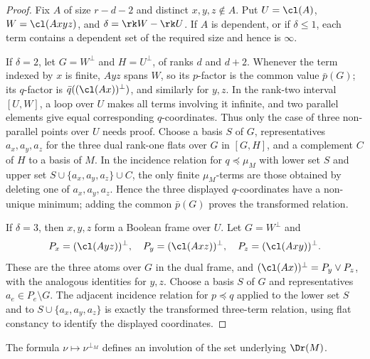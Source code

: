 \begin{proof}
Fix $A$ of size $r-d-2$ and distinct $x,y,z\notin A$.  Put
$U=\cl(A)$, $W=\cl(Axyz)$, and $\delta=\rk W-\rk U$.  If $A$ is
dependent, or if $\delta\le1$, each term contains a dependent set of the
required size and hence is $\infty$.

If $\delta=2$, let $G=W^\perp$ and $H=U^\perp$, of ranks $d$ and
$d+2$.  Whenever the term indexed by $x$ is finite, $Ayz$ spans $W$,
so its $p$-factor is the common value $\bar p(G)$; its $q$-factor is
$\bar q((\cl(Ax))^\perp)$, and similarly for $y,z$.  In the rank-two
interval $[U,W]$, a loop over $U$ makes all terms involving it
infinite, and two parallel elements give equal corresponding
$q$-coordinates.  Thus only the case of three non-parallel points over
$U$ needs proof.  Choose a basis $S$ of $G$, representatives
$a_x,a_y,a_z$ for the three dual rank-one flats over $G$ in $[G,H]$,
and a complement $C$ of $H$ to a basis of $M$.  In the incidence
relation for $q\preceq\mu_M$ with lower set $S$ and upper set
$S\cup\{a_x,a_y,a_z\}\cup C$, the only finite $\mu_M$-terms are those
obtained by deleting one of $a_x,a_y,a_z$.  Hence the three displayed
$q$-coordinates have a non-unique minimum; adding the common
$\bar p(G)$ proves the transformed relation.

If $\delta=3$, then $x,y,z$ form a Boolean frame over $U$.  Let
$G=W^\perp$ and
\[
 P_x=(\cl(Ayz))^\perp,\quad P_y=(\cl(Axz))^\perp,\quad
 P_z=(\cl(Axy))^\perp .
\]
These are the three atoms over $G$ in the dual frame, and
$(\cl(Ax))^\perp=P_y\vee P_z$, with the analogous identities for
$y,z$.  Choose a basis $S$ of $G$ and representatives
$a_e\in P_e\setminus G$.  The adjacent incidence relation for
$p\preceq q$ applied to the lower set $S$ and to
$S\cup\{a_x,a_y,a_z\}$ is exactly the transformed three-term relation,
using flat constancy to identify the displayed coordinates.
\end{proof}

\begin{proposition}\label{prop:set}
The formula $\nu\mapsto\nu^{\perp_M}$ defines an involution of the set
underlying $\Dr(M)$.
\end{proposition}

